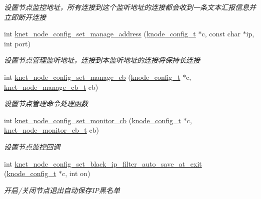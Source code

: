 \begin{DoxyCompactItemize}
\begin{DoxyCompactList}\small\item\em 设置节点监控地址，所有连接到这个监听地址的连接都会收到一条文本汇报信息并立即断开连接 \end{DoxyCompactList}\item 
int \hyperlink{a00106_ad3115d36499edba688f8cab22c17d176_ad3115d36499edba688f8cab22c17d176}{knet\+\_\+node\+\_\+config\+\_\+set\+\_\+manage\+\_\+address} (\hyperlink{a00066_af1cfaee0eb1c76ebf06076b95cc47ee1_af1cfaee0eb1c76ebf06076b95cc47ee1}{knode\+\_\+config\+\_\+t} $\ast$c, const char $\ast$ip, int port)
\begin{DoxyCompactList}\small\item\em 设置节点管理监听地址，连接到本监听地址的连接将保持长连接 \end{DoxyCompactList}\item 
int \hyperlink{a00106_aa82ac1ed089ff25d2b1c45393013bebe_aa82ac1ed089ff25d2b1c45393013bebe}{knet\+\_\+node\+\_\+config\+\_\+set\+\_\+manage\+\_\+cb} (\hyperlink{a00066_af1cfaee0eb1c76ebf06076b95cc47ee1_af1cfaee0eb1c76ebf06076b95cc47ee1}{knode\+\_\+config\+\_\+t} $\ast$c, \hyperlink{a00066_acd4bad75f444cb56dffa5f9413bbe456_acd4bad75f444cb56dffa5f9413bbe456}{knet\+\_\+node\+\_\+manage\+\_\+cb\+\_\+t} cb)
\begin{DoxyCompactList}\small\item\em 设置节点管理命令处理函数 \end{DoxyCompactList}\item 
int \hyperlink{a00106_a65292f1c4174dbd6c6366411a5b5fb3c_a65292f1c4174dbd6c6366411a5b5fb3c}{knet\+\_\+node\+\_\+config\+\_\+set\+\_\+monitor\+\_\+cb} (\hyperlink{a00066_af1cfaee0eb1c76ebf06076b95cc47ee1_af1cfaee0eb1c76ebf06076b95cc47ee1}{knode\+\_\+config\+\_\+t} $\ast$c, \hyperlink{a00066_aabd13837697aceb20b2a2cb8908e79cd_aabd13837697aceb20b2a2cb8908e79cd}{knet\+\_\+node\+\_\+monitor\+\_\+cb\+\_\+t} cb)
\begin{DoxyCompactList}\small\item\em 设置节点监控回调 \end{DoxyCompactList}\item 
int \hyperlink{a00106_ae0b28ed1a50ca87b7d74aa8a3f6e2245_ae0b28ed1a50ca87b7d74aa8a3f6e2245}{knet\+\_\+node\+\_\+config\+\_\+set\+\_\+black\+\_\+ip\+\_\+filter\+\_\+auto\+\_\+save\+\_\+at\+\_\+exit} (\hyperlink{a00066_af1cfaee0eb1c76ebf06076b95cc47ee1_af1cfaee0eb1c76ebf06076b95cc47ee1}{knode\+\_\+config\+\_\+t} $\ast$c, int on)
\begin{DoxyCompactList}\small\item\em 开启/关闭节点退出自动保存\+I\+P黑名单 \end{DoxyCompactList}\item 

\end{DoxyCompactItemize}
